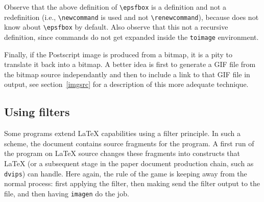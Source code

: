 Observe that the above definition of \verb+\epsfbox+ is a definition
and not a redefinition (i.e., \verb+\newcommand+ is used and not
\verb+\renewcommand+),
because \hevea{} does not know about \verb+\epsfbox+ by default.
Also observe that this not a recursive definition, since
commands do not get expanded inside the \verb+toimage+ environment.

Finally, if the Postscript image is produced from a bitmap, it is
a pity to translate it back into a bitmap.
A better idea is first to generate a GIF file from the bitmap source
independantly
and then to include a link to that GIF file in \html{} output, see
section~\ref{imgsrc} for a description of this more adequate technique.


\subsection{Using filters}

Some programs extend \LaTeX{} capabilities using a filter principle.
In such a scheme, the document contains source fragments for the program.
A first run of the program on \LaTeX{} source changes these fragments
into constructs that \LaTeX{} (or a subsequent stage in the paper
document production chain, such as \texttt{dvips}) can handle.
Here again, the rule of the game is keeping \hevea{} away from the
normal process: first applying the filter, then making \hevea{} send
the filter output to the  file, and then having
\texttt{imagen} do the job.


